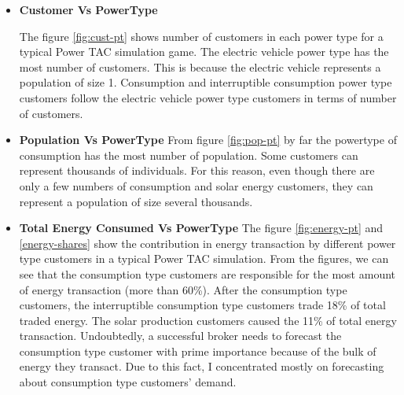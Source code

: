\begin{itemize}
\item \textbf{Customer Vs PowerType}

The figure \ref{fig:cust-pt} shows number of customers in each power type for a typical Power TAC simulation game. The electric vehicle power type has the most number of customers. This is because the electric vehicle represents a population of size 1. Consumption and interruptible consumption power type customers follow the electric vehicle power type customers in terms of number of customers. 

\item \textbf{Population Vs PowerType}
From figure \ref{fig:pop-pt} by far the powertype of consumption has the most number of population. Some customers can represent thousands of individuals. For this reason, even though there are only a few numbers of consumption and solar energy customers, they can represent a population of size several thousands. 

\item \textbf{Total Energy Consumed Vs PowerType}
The figure \ref{fig:energy-pt} and \ref{energy-shares} show the contribution in energy transaction by different power type customers in a typical Power TAC simulation. From the figures, we can see that the consumption type customers are responsible for the most amount of energy transaction (more than 60\%). After the consumption type customers, the interruptible consumption type customers trade 18\% of total traded energy. The solar production customers caused the 11\% of total energy transaction. Undoubtedly, a successful broker needs to forecast the consumption type customer with prime importance because of the bulk of energy they transact. Due to this fact, I concentrated mostly on forecasting about consumption type customers' demand.



\end{itemize}
